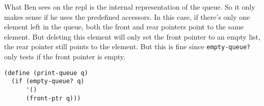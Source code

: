 \documentclass[a4paper,12pt]{article}
\begin{document}
What Ben sees on the repl is the internal representation of the queue.
So it only makes sense if he uses the predefined accessors.  In this
case, if there's only one element left in the queue, both the front
and rear pointers point to the same element.  But deleting this
element will only set the front pointer to an empty list, the rear
pointer still points to the element.  But this is fine since
\lstinline!empty-queue?! only tests if the front pointer is empty.
\begin{lstlisting}
(define (print-queue q)
  (if (empty-queue? q)
      '()
      (front-ptr q)))
\end{lstlisting}
\end{document}
